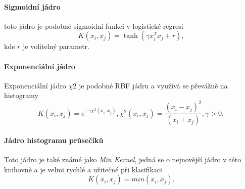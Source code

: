\paragraph*{Sigmoidní jádro} 
toto jádro je podobné sigmoidní funkci v logistické regresi
\begin{equation*}
\label{sigmK}
 K(x_i, x_j) = \tanh(\gamma x_i^T x_j + r),
\end{equation*}
kde $r$ je volitelný parametr.

\paragraph*{Exponenciální jádro} 
Exponenciální jádro $\chi$2 je podobné RBF jádru a využívá se převážně na histogramy
\begin{equation*}
\label{expK}
 K(x_i, x_j) = e^{-\gamma \chi^2(x_i,x_j)}, \chi^2(x_i,x_j) = \frac{(x_i-x_j)^2}{(x_i+x_j)}, \gamma > 0,
\end{equation*}

\paragraph*{Jádro histogramu průsečíků} 
Toto jádro je také známé jako \textit{Min Kernel}, jedná se o nejnovější jádro v této knihovně a je velmi rychlé a užitečné při klasifikaci
\begin{equation*}
\label{innK}
 K(x_i, x_j) = min(x_i,x_j).
\end{equation*}

